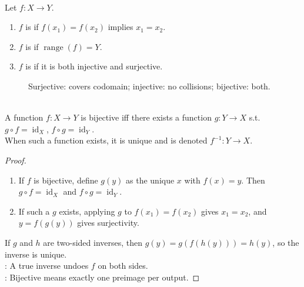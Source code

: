 \begin{definition} \label{def:injective-surjective-bijective} \\
Let $f:X\to Y$.
\begin{enumerate}[label=\roman*.]
\setlength{\itemsep}{0pt}
\item $f$ is  if $f(x_1)=f(x_2)$ implies $x_1=x_2$.
\item $f$ is  if $\operatorname{range}(f)=Y$.
\item $f$ is  if it is both injective and surjective.
\end{enumerate}
\end{definition}

\begin{figure}[H]
  \centering
  
  \caption{Surjective: covers codomain; injective: no collisions; bijective: both.}
  \label{fig:injective-surjective-bijective-maps}
\end{figure}

\begin{theorem} \label{thm:bijective-iff-invertible-function} \\
A function $f:X\to Y$ is bijective iff there exists a function $g:Y\to X$ s.t. $g\circ f=\operatorname{id}_X$, $f\circ g=\operatorname{id}_Y$.\\
When such a function exists, it is unique and is denoted $f^{-1}:Y\to X$.
\begin{proof}
\begin{enumerate}[label=\roman*.]
\setlength{\itemsep}{0pt}
\item[$(\Rightarrow)$] If $f$ is bijective, define $g(y)$ as the unique $x$ with $f(x)=y$. Then $g\circ f=\operatorname{id}_X$ and $f\circ g=\operatorname{id}_Y$.
\item[$(\Leftarrow)$] If such a $g$ exists, applying $g$ to $f(x_1)=f(x_2)$ gives $x_1=x_2$, and $y=f(g(y))$ gives surjectivity.
\end{enumerate}
If $g$ and $h$ are two-sided inverses, then $g(y)=g(f(h(y)))=h(y)$, so the inverse is unique.\\
: A true inverse undoes $f$ on both sides.\\
: Bijective means exactly one preimage per output.
\end{proof}
\end{theorem}

